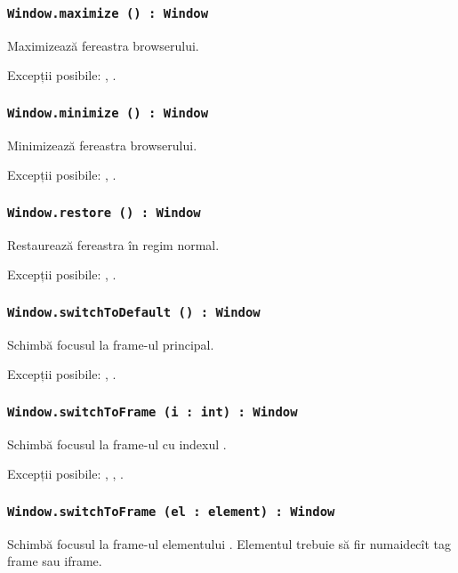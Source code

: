 \subsubsection{\lstinline|Window.maximize () : Window|}

Maximizează fereastra browserului.

Excepții posibile: , .

\subsubsection{\lstinline|Window.minimize () : Window|}

Minimizează fereastra browserului.

Excepții posibile: , .

\subsubsection{\lstinline|Window.restore () : Window|}

Restaurează fereastra în regim normal.

Excepții posibile: , .

\subsubsection{\lstinline|Window.switchToDefault () : Window|}

Schimbă focusul la frame-ul principal.

Excepții posibile: , .

\subsubsection{\lstinline|Window.switchToFrame (i : int) : Window|}

Schimbă focusul la frame-ul cu indexul .

Excepții posibile: , , .

\subsubsection{\lstinline|Window.switchToFrame (el : element) : Window|}

Schimbă focusul la frame-ul elementului . Elementul trebuie să fir numaidecît tag frame sau iframe.

